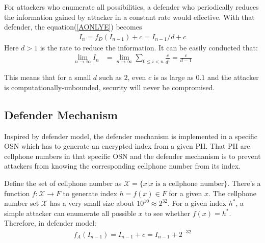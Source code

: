 \documentclass[10pt, conference, compsocconf]{IEEEtran}
\begin{document}
		For attackers who enumerate all possibilities,
		a defender 
		who periodically reduces the information gained by
		attacker in a constant rate would effective. With
		that defender,
		the equation(\ref{AONLYE}) becomes
		\begin{align}
			I_n = f_D(I_{n-1})+c = I_{n-1}/d+c
		\end{align}
		Here $d > 1$ is the rate to reduce the information.
		It can be easily conducted that:
		\begin{align*}
			\lim_{n \rightarrow \infty} I_n &= \lim_{n \rightarrow \infty} \sum_{0 \leq i < n} \frac{c}{d^i}
				= \frac{c}{d-1}
		\end{align*}
		
		This means that for a small $d$ such as $2$, even $c$ is as large as
		$0.1$ and the attacker is computationally-unbounded, security will
		never be compromised.
		
	\subsection{Defender Mechanism}\label{sec_ds}
		Inspired by defender model, the defender mechanism is implemented
		in a specific OSN
		which has to generate an encrypted index
		from a given PII. That PII are cellphone numbers
		in that specific OSN and the defender mechanism is to prevent attackers
		from knowing the corresponding cellphone number from its index.
		
		Define the set of cellphone number as 
		$\mathcal X = \{x | \text{$x$ is a cellphone number}\}$.
		There's a function $f: \mathcal X \rightarrow F$ to generate index $h = f(x) \in F$ for
		a given $x$. The cellphone number set $\mathcal X$ has a very small
		size about $10^{10} \approx 2^{32}$. For a given index $h^*$, a simple attacker
		can enumerate all possible $x$ to see whether $f(x) = h^*$. Therefore, in defender
		model:
		\begin{align*}
			f_A(I_{n-1}) = I_{n-1}+c = I_{n-1}+2^{-32}
		\end{align*}
		
\end{document}
